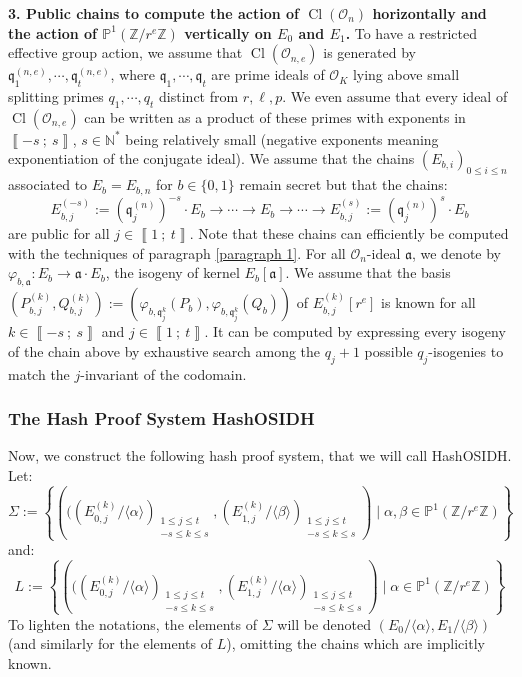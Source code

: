 \documentclass[a4paper,10pt]{report}
\theoremstyle{definition}
\theoremstyle{plain}
\theoremstyle{definition}
\newcommand{\N}{\mathbb{N}}
\newcommand{\Z}{\mathbb{Z}}
\newcommand{\mO}{\mathcal{O}}
\renewcommand{\i}[2]{\left\llbracket #1~;~#2\right\rrbracket}
\renewcommand{\(}{\left(}
\renewcommand{\)}{\right)}
\renewcommand{\P}{\mathbb{P}}
\newcommand{\mf}[1]{\mathfrak{#1}}
\DeclareMathOperator{\Cl}{Cl}
\begin{document}
\textbf{3. Public chains to compute the action of $\Cl(\mO_n)$ horizontally and the action of $\P^1(\Z/r^e\Z)$ vertically on $E_0$ and $E_1$.}
To have a restricted effective group action, we assume that $\Cl(\mO_{n,e})$ is generated by $\mf{q}_1^{(n,e)}, \cdots, \mf{q}_t^{(n,e)}$, where $\mf{q}_1, \cdots, \mf{q}_t$ are prime ideals of $\mO_K$ lying above small splitting primes $q_1, \cdots, q_t$ distinct from $r,\ell,p$. We even assume that every ideal of $\Cl(\mO_{n,e})$ can be written as a product of these primes with exponents in $\i{-s}{s}$, $s\in\N^*$ being relatively small (negative exponents meaning exponentiation of the conjugate ideal). We assume that the chains $(E_{b,i})_{0\leq i\leq n}$ associated to $E_b=E_{b,n}$ for $b\in\{0,1\}$ remain secret but that the chains:
\[E_{b,j}^{(-s)}:=(\mf{q}_j^{(n)})^{-s}\cdot E_b\longrightarrow \cdots \longrightarrow E_{b}\longrightarrow \cdots\longrightarrow E_{b,j}^{(s)}:=(\mf{q}_j^{(n)})^{s}\cdot E_b\]
are public for all $j\in\i{1}{t}$. Note that these chains can efficiently be computed with the techniques of paragraph \ref{paragraph 1}.  For all $\mO_n$-ideal $\mf{a}$, we denote by $\varphi_{b,\mf{a}}:E_b\longrightarrow \mf{a}\cdot E_b$, the isogeny of kernel $E_b[\mf{a}]$. We assume that the basis $(P_{b,j}^{(k)},Q_{b,j}^{(k)}):=(\varphi_{b,\mf{q}_j^{k}}(P_b),\varphi_{b,\mf{q}_j^{k}}(Q_b))$ of $E_{b,j}^{(k)}[r^e]$ is known for all $k\in\i{-s}{s}$ and $j\in\i{1}{t}$. It can be computed by expressing every isogeny of the chain above by exhaustive search among the $q_j+1$ possible $q_j$-isogenies to match the $j$-invariant of the codomain.

\subsubsection{The Hash Proof System HashOSIDH}

Now, we construct the following hash proof system, that we will call HashOSIDH. Let:
\[\Sigma:=\left\{\(((E_{0,j}^{(k)}/\langle\alpha\rangle)_{\substack{1\leq j\leq t\\ -s\leq k\leq s}}, (E_{1,j}^{(k)}/\langle\beta \rangle)_{\substack{1\leq j\leq t\\ -s\leq k\leq s}}\)\mid \alpha,\beta\in\P^1(\Z/r^e\Z)\right\}\]
and:
\[L:=\left\{\(((E_{0,j}^{(k)}/\langle\alpha\rangle)_{\substack{1\leq j\leq t\\ -s\leq k\leq s}}, (E_{1,j}^{(k)}/\langle\alpha \rangle)_{\substack{1\leq j\leq t\\ -s\leq k\leq s}}\)\mid \alpha\in\P^1(\Z/r^e\Z)\right\}\]
To lighten the notations, the elements of $\Sigma$ will be denoted $(E_0/\langle\alpha\rangle, E_1/\langle\beta\rangle)$ (and similarly for the elements of $L$), omitting the chains which are implicitly known. 
\end{document}
